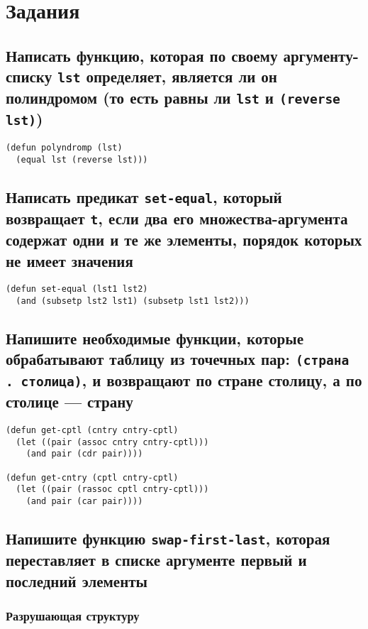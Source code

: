 \chapter{Задания}

\section{Написать функцию, которая по своему аргументу-списку \texttt{lst} определяет, является ли он полиндромом (то есть равны ли \texttt{lst} и \texttt{(reverse lst)})}

\begin{lstlisting}
(defun polyndromp (lst)
  (equal lst (reverse lst)))
\end{lstlisting}

\section{Написать предикат \texttt{set-equal}, который возвращает \texttt{t}, если два его множества-аргумента содержат одни и те же элементы, порядок которых не имеет значения}

\begin{lstlisting}
(defun set-equal (lst1 lst2) 
  (and (subsetp lst2 lst1) (subsetp lst1 lst2)))
\end{lstlisting}

\section{Напишите необходимые функции, которые обрабатывают таблицу из точечных пар: \texttt{(страна . столица)}, и возвращают по стране столицу, а по столице --- страну}

\begin{lstlisting}
(defun get-cptl (cntry cntry-cptl)
  (let ((pair (assoc cntry cntry-cptl)))
    (and pair (cdr pair))))

(defun get-cntry (cptl cntry-cptl)
  (let ((pair (rassoc cptl cntry-cptl)))
    (and pair (car pair))))
\end{lstlisting}

\section{Напишите функцию \texttt{swap-first-last}, которая переставляет в списке аргументе первый и последний элементы}

\subsection{Разрушающая структуру}

